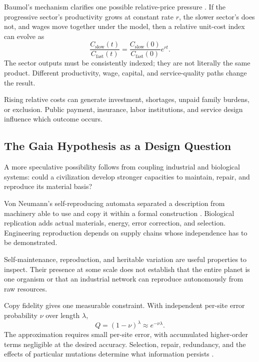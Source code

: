 \documentclass[11pt,openany]{book}
\begin{document}
Baumol's mechanism clarifies one possible relative-price pressure \cite{baumol1967macro}. If the progressive sector's productivity grows at constant rate $r$, the slower sector's does not, and wages move together under the model, then a relative unit-cost index can evolve as
\begin{equation}
 \frac{C_{\mathrm{slow}}(t)}{C_{\mathrm{fast}}(t)}
 =
 \frac{C_{\mathrm{slow}}(0)}{C_{\mathrm{fast}}(0)}
 e^{rt}.
\end{equation}
The sector outputs must be consistently indexed; they are not literally the same product. Different productivity, wage, capital, and service-quality paths change the result.

Rising relative costs can generate investment, shortages, unpaid family burdens, or exclusion. Public payment, insurance, labor institutions, and service design influence which outcome occurs.

\subsection{The Gaia Hypothesis as a Design Question}

A more speculative possibility follows from coupling industrial and biological systems: could a civilization develop stronger capacities to maintain, repair, and reproduce its material basis?

Von Neumann's self-reproducing automata separated a description from machinery able to use and copy it within a formal construction \cite{vonneumann1966theory}. Biological replication adds actual materials, energy, error correction, and selection. Engineering reproduction depends on supply chains whose independence has to be demonstrated.

Self-maintenance, reproduction, and heritable variation are useful properties to inspect. Their presence at some scale does not establish that the entire planet is one organism or that an industrial network can reproduce autonomously from raw resources.

Copy fidelity gives one measurable constraint. With independent per-site error probability $\nu$ over length $\lambda$,
\begin{equation}
 Q=(1-\nu)^\lambda\approx e^{-\nu\lambda}.
\end{equation}
The approximation requires small per-site error, with accumulated higher-order terms negligible at the desired accuracy. Selection, repair, redundancy, and the effects of particular mutations determine what information persists \cite{kunkel2000dna,gilbert1986}.
\end{document}
